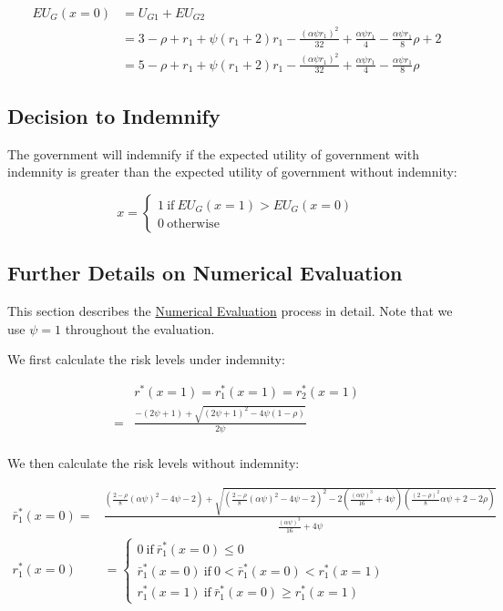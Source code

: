 \documentclass[
  a4paper,
  abstract=true]{scrartcl}
\theoremstyle{definition}
\begin{document}
\begin{align*}
EU_G(x=0)&=U_{G1}+EU_{G2}\\
&=3-\rho+r_1+\psi(r_1+2)r_1-\frac{(\alpha\psi r_1)^2}{32}+\frac{\alpha\psi r_1}{4}-\frac{\alpha\psi r_1}{8}\rho+2 \\
&=5-\rho+r_1+\psi(r_1+2)r_1-\frac{(\alpha\psi r_1)^2}{32}+\frac{\alpha\psi r_1}{4}-\frac{\alpha\psi r_1}{8}\rho
\end{align*}

\subsection{Decision to Indemnify}\label{decision-to-indemnify}

The government will indemnify if the expected utility of government with
indemnity is greater than the expected utility of government without
indemnity:

\[
x=\begin{cases}
1~\text{if}~ EU_G(x=1)>EU_G(x=0)\\
0~\text{otherwise}
\end{cases}
\]

\subsection{Further Details on Numerical
Evaluation}\label{further-details-on-numerical-evaluation}

This section describes the \hyperref[sec-simulation]{Numerical
Evaluation} process in detail. Note that we use \(\psi=1\) throughout
the evaluation.

We first calculate the risk levels under indemnity:

\begin{align*}
&r^*(x=1)=r^*_1(x=1)=r^*_2(x=1) \\
=&\frac{-(2\psi+1)+\sqrt{(2\psi+1)^2-4\psi(1-\rho)}}{2\psi} \\
\end{align*}

We then calculate the risk levels without indemnity:

\begin{align*}
\bar r_1^*(x=0)=&\frac{(\frac{2-\rho}{8}(\alpha\psi)^2-4\psi-2)+\sqrt{(\frac{2-\rho}{8}(\alpha\psi)^2-4\psi-2)^2-2(\frac{(\alpha\psi)^3}{16}+4\psi)(\frac{(2-\rho)^2}{8}\alpha\psi+2-2\rho)}}{\frac{(\alpha\psi)^3}{16}+4\psi} \\
r_1^*(x=0)&=\begin{cases}
0~\text{if}~\bar r_1^*(x=0)\leq0\\
\bar r_1^*(x=0)~\text{if}~0<\bar r_1^*(x=0)<r_1^*(x=1) \\
r_1^*(x=1)~\text{if}~\bar r_1^*(x=0)\geq r_1^*(x=1)
\end{cases}
\end{align*}
\end{document}
